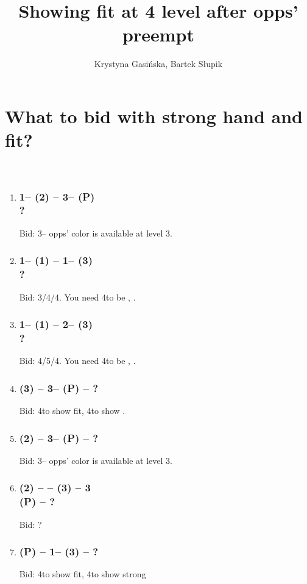 \documentclass[12pt, a4paper]{article}
\title{Showing fit at 4 level after opps' preempt}
\author{Krystyna Gasińska, Bartek Słupik}
\begin{document}
\maketitle

\section{What to bid with strong hand and fit?}
\,\vspace{-10pt} %

\begin{enumerate}
    \item 
    \subsubsection*{1\minor -- (2\spades) -- 3\hearts -- (P) \\ ?}
Bid: 3\spades -- opps' color is available at level 3.
    \item 
    \subsubsection*{1\minor -- (1\hearts) -- 1\spades -- (3\hearts) \\ ?}
Bid: 3\spades/4\spades/4\hearts. You need 4\clubs to be \nat, \nf. \qq
    \item 
    \subsubsection*{1\hearts -- (1\spades) -- 2\diams -- (3\spades) \\ ?}
Bid: 4\diams/5\diams/4\spades. You need 4\clubs to be \nat, \nf.
    \item 
\subsubsection*{(3\diams) -- 3\major -- (P) -- ?}
Bid: 4\clubs to show fit, 4\diams to show \clubs.
\item 
\subsubsection*{(2\spades) -- 3\hearts -- (P) -- ?}
Bid: 3\spades -- opps' color is available at level 3.
\item 
\subsubsection*{(2\hearts) -- \dbl -- (3\hearts) -- 3\spades \\ (P) -- ?}
Bid: ? \qq
\item 
\subsubsection*{(P) -- 1\hearts -- (3\spades) -- ?}
Bid: 4\clubs to show fit, 4\spades to show strong \clubs \qq
\end{enumerate}
\end{document}
